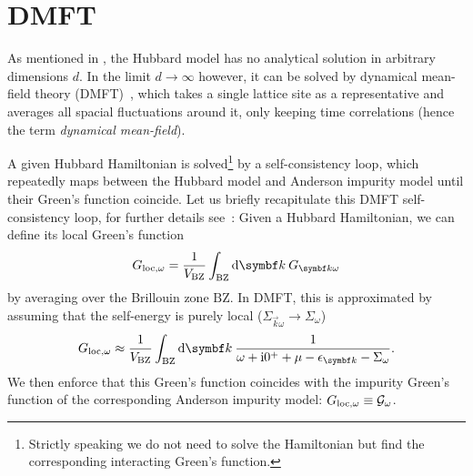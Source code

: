 \pagebreak
\section{DMFT}%
\label{sec:dmft}

As mentioned in ,
the Hubbard model has no analytical solution in arbitrary dimensions $d$.
In the limit $d\to\infty$ however, it can be solved by
dynamical mean-field theory (DMFT)~\cite{Georges1996},
which takes a single lattice site as a representative
and averages all spacial fluctuations around it, only keeping time correlations
(hence the term \emph{dynamical mean-field}).

A given Hubbard Hamiltonian is solved\footnote{
    Strictly speaking we do not need to solve the Hamiltonian but find
    the corresponding interacting Green's function.
}
by a self-consistency loop,
which repeatedly maps between the Hubbard model and Anderson impurity model until
their Green's function coincide.
Let us briefly recapitulate this DMFT self-consistency loop,
for further details see~\cite{Georges1996, Held2007}:
Given a Hubbard Hamiltonian, we can define its local Green's function
\begin{equation}
    G_{\mloc,\omega}
    =
    \frac{1}{V_\mBZ} \int_\mBZ \md\vec{k}\> G_{\vec{k}\omega}
\end{equation}
by averaging over the Brillouin zone $\mathrm{BZ}$.
In DMFT, this is approximated by assuming that the self-energy is purely local
($\Sigma_{\vec{k}\omega} \to \Sigma_\omega$)
\begin{equation}
    G_{\mloc,\omega}
    \approx
    \frac{1}{V_\mBZ} \int_\mBZ \md\vec{k}\> \frac{1}{\omega + \mi0^+ + \mu - \epsilon_{\vec{k}} - \Sigma_\omega}.
    \label{eq:greens-function-local-approx}
\end{equation}
We then enforce that this Green's function coincides with the impurity Green's function
of the corresponding Anderson impurity model: $G_{\mathrm{loc},\omega} \equiv \mathcal{G}_\omega$.


